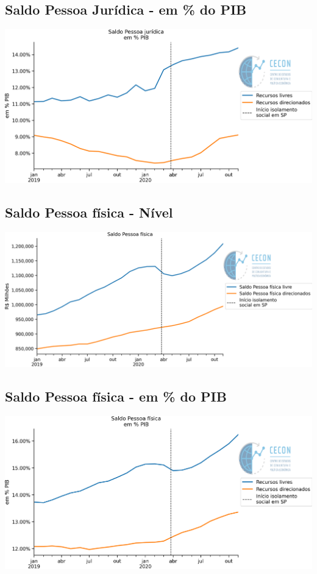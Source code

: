 \documentclass{SelfArx}
\begin{document}
\subsection*{Saldo Pessoa Jurídica - em \% do PIB}
\label{sec:orgbcaa825}
\begin{center}
\includegraphics[width=.9\linewidth]{./figs/Credito/SaldoPJ_PIB.png}
\end{center}

\subsection*{Saldo Pessoa física - Nível}
\label{sec:orga255c2e}

\begin{center}
\includegraphics[width=.9\linewidth]{./figs/Credito/SaldoPF.png}
\end{center}


\subsection*{Saldo Pessoa física - em \% do PIB}
\label{sec:org60df635}

\begin{center}
\includegraphics[width=.9\linewidth]{./figs/Credito/SaldoPF_PIB.png}
\end{center}
\end{document}
